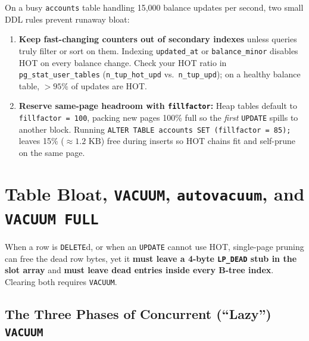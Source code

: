 \begin{applicationbox}
On a busy \texttt{accounts} table handling 15,000 balance updates per second, two small DDL rules prevent runaway bloat:
\begin{enumerate}
  \item \textbf{Keep fast-changing counters out of secondary indexes} unless queries truly filter or sort on them. Indexing \texttt{updated\_at} or \texttt{balance\_minor} disables HOT on every balance change. Check your HOT ratio in \texttt{pg\_stat\_user\_tables} (\texttt{n\_tup\_hot\_upd} vs.\ \texttt{n\_tup\_upd}); on a healthy balance table, $>95\%$ of updates are HOT.
  \item \textbf{Reserve same-page headroom with \texttt{fillfactor}:} Heap tables default to \texttt{fillfactor = 100}, packing new pages 100\% full so the \emph{first} \texttt{UPDATE} spills to another block. Running \texttt{ALTER TABLE accounts SET (fillfactor = 85);} leaves 15\% ($\approx 1.2\text{ KB}$) free during inserts so HOT chains fit and self-prune on the same page.
\end{enumerate}
\end{applicationbox}

\section{Table Bloat, \texttt{VACUUM}, \texttt{autovacuum}, and \texttt{VACUUM FULL}}
\label{ch05:vacuum}

When a row is \texttt{DELETE}d, or when an \texttt{UPDATE} cannot use HOT, single-page pruning can free the dead row bytes, yet it \textbf{must leave a 4-byte \texttt{LP\_DEAD} stub in the slot array} and \textbf{must leave dead entries inside every B-tree index}. Clearing both requires \texttt{VACUUM}.

\subsection{The Three Phases of Concurrent (``Lazy'') \texttt{VACUUM}}

